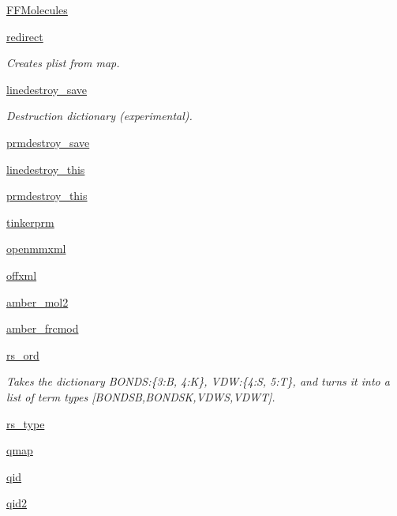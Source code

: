 \begin{DoxyCompactItemize}
\hyperlink{classsrc_1_1ffyapf_1_1FF_afee4ac5d39a026fc88efa63d3e82b105}{F\+F\+Molecules}
\item 
\hyperlink{classsrc_1_1ffyapf_1_1FF_a605dfe868e2fb26f2e15b4478f7b6eeb}{redirect}
\begin{DoxyCompactList}\small\item\em Creates plist from map. \end{DoxyCompactList}\item 
\hyperlink{classsrc_1_1ffyapf_1_1FF_a7bf885d5ba1489b97bb4b90dc689f252}{linedestroy\+\_\+save}
\begin{DoxyCompactList}\small\item\em Destruction dictionary (experimental). \end{DoxyCompactList}\item 
\hyperlink{classsrc_1_1ffyapf_1_1FF_abb8aab8aafc7bfe637d5fcf226debaad}{prmdestroy\+\_\+save}
\item 
\hyperlink{classsrc_1_1ffyapf_1_1FF_a045adc994f0b33cfe27ec9e07faef38f}{linedestroy\+\_\+this}
\item 
\hyperlink{classsrc_1_1ffyapf_1_1FF_a75537037c3d897b85f7d54b45dbca014}{prmdestroy\+\_\+this}
\item 
\hyperlink{classsrc_1_1ffyapf_1_1FF_a8ed82b69537dcbc5f0b436e20689dc22}{tinkerprm}
\item 
\hyperlink{classsrc_1_1ffyapf_1_1FF_a4d47f2447aecbbbc5b49f64eecd51cff}{openmmxml}
\item 
\hyperlink{classsrc_1_1ffyapf_1_1FF_a65543d043d27378c63ac7d6ab4e4ba32}{offxml}
\item 
\hyperlink{classsrc_1_1ffyapf_1_1FF_a4367fddb00f17b504ded233b3324a2f3}{amber\+\_\+mol2}
\item 
\hyperlink{classsrc_1_1ffyapf_1_1FF_acba0e3b93ce2a36e03e56bcb63e9645b}{amber\+\_\+frcmod}
\item 
\hyperlink{classsrc_1_1ffyapf_1_1FF_a4a23c7867d6cc24c86f77fff3ce056e0}{rs\+\_\+ord}
\begin{DoxyCompactList}\small\item\em Takes the dictionary \textquotesingle{}B\+O\+N\+DS\textquotesingle{}\+:\{3\+:\textquotesingle{}B\textquotesingle{}, 4\+:\textquotesingle{}K\textquotesingle{}\}, \textquotesingle{}V\+DW\textquotesingle{}\+:\{4\+:\textquotesingle{}S\textquotesingle{}, 5\+:\textquotesingle{}T\textquotesingle{}\}, and turns it into a list of term types \mbox{[}\textquotesingle{}B\+O\+N\+D\+SB\textquotesingle{},\textquotesingle{}B\+O\+N\+D\+SK\textquotesingle{},\textquotesingle{}V\+D\+WS\textquotesingle{},\textquotesingle{}V\+D\+WT\textquotesingle{}\mbox{]}. \end{DoxyCompactList}\item 
\hyperlink{classsrc_1_1ffyapf_1_1FF_a7299d76bfff2489099eb88b4b5479245}{rs\+\_\+type}
\item 
\hyperlink{classsrc_1_1ffyapf_1_1FF_a52a4a2d74424530171a1bf5cae4f8ad9}{qmap}
\item 
\hyperlink{classsrc_1_1ffyapf_1_1FF_a59eed571d6673a73cabc156bc82dc73b}{qid}
\item 
\hyperlink{classsrc_1_1ffyapf_1_1FF_a7a77e7aeb6678815e269096d33080842}{qid2}
\end{DoxyCompactItemize}



